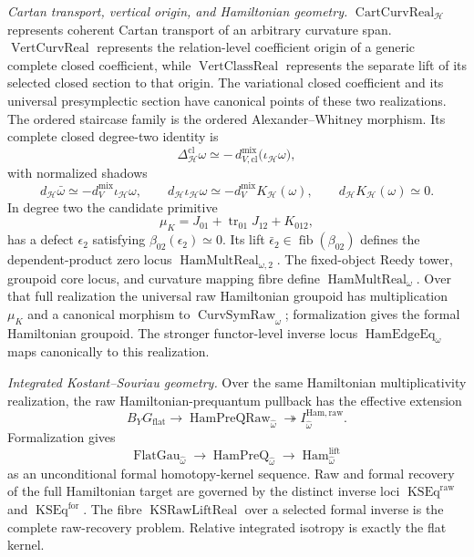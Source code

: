 \begin{theorem}
\medskip
\noindent\emph{Cartan transport, vertical origin, and Hamiltonian geometry.}
$\operatorname{CartCurvReal}_{\mathcal H}$ represents coherent Cartan transport
of an arbitrary curvature span.  $\operatorname{VertCurvReal}$ represents the
relation-level coefficient origin of a generic complete closed coefficient, while
$\operatorname{VertClassReal}$ represents the separate lift of its selected closed
section to that origin.  The variational closed coefficient and its universal
presymplectic section have canonical points of these two realizations.
The ordered staircase family is the ordered Alexander--Whitney morphism.  Its
complete closed degree-two identity is
\[
\boxed{
\Delta^{\mathrm{cl}}_{\mathcal H}\omega
\simeq
-\,d^{\mathrm{mix}}_{V,\mathrm{cl}}
\bigl(\iota_{\mathcal H}\omega\bigr),
}
\]
with normalized shadows
\[
d_{\mathcal H}\bar\omega
\simeq-d_V^{\mathrm{mix}}\iota_{\mathcal H}\omega,
\qquad
 d_{\mathcal H}\iota_{\mathcal H}\omega
\simeq-d_V^{\mathrm{mix}}K_{\mathcal H}(\omega),
\qquad
 d_{\mathcal H}K_{\mathcal H}(\omega)\simeq0.
\]
In degree two the candidate primitive
\[
\mu_K
=
J_{01}+\operatorname{tr}_{01}J_{12}+K_{012},
\]
has a defect $\epsilon_2$ satisfying
$\beta_{02}(\epsilon_2)\simeq0$.  Its lift
$\bar\epsilon_2\in\operatorname{fib}(\beta_{02})$ defines the dependent-product
zero locus $\operatorname{HamMultReal}_{\omega,2}$.  The fixed-object Reedy
tower, groupoid core locus, and curvature mapping fibre define
$\operatorname{HamMultReal}_{\omega}$.  Over that full realization the
universal raw Hamiltonian groupoid has multiplication $\mu_K$ and a canonical
morphism to $\operatorname{CurvSymRaw}_{\omega}$; formalization gives the formal
Hamiltonian groupoid.  The stronger functor-level inverse locus
$\operatorname{HamEdgeEq}_{\omega}$ maps canonically to this realization.

\medskip
\noindent\emph{Integrated Kostant--Souriau geometry.}
Over the same Hamiltonian multiplicativity realization, the raw
Hamiltonian-prequantum pullback has the effective extension
\[
\boxed{
B_YG_{\mathrm{flat}}
\longrightarrow
\operatorname{HamPreQRaw}_{\widehat\omega}
\twoheadrightarrow
I^{\mathrm{Ham,raw}}_{\widehat\omega}.
}
\]
Formalization gives
\[
\boxed{
\operatorname{FlatGau}_{\widehat\omega}
\longrightarrow
\operatorname{HamPreQ}_{\widehat\omega}
\longrightarrow
\operatorname{Ham}^{\mathrm{lift}}_{\widehat\omega}
}
\]
as an unconditional formal homotopy-kernel sequence.  Raw and formal recovery of
the full Hamiltonian target are governed by the distinct inverse loci
$\operatorname{KSEq}^{\mathrm{raw}}$ and
$\operatorname{KSEq}^{\mathrm{for}}$.  The fibre
$\operatorname{KSRawLiftReal}$ over a selected formal inverse is the complete
raw-recovery problem.  Relative integrated isotropy is exactly the flat kernel.


\end{theorem}
